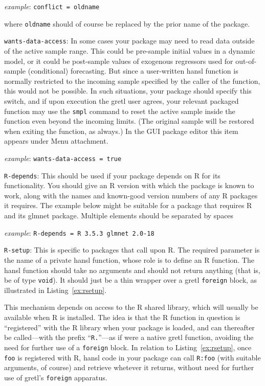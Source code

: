 \documentclass[oneside]{book}
\newcommand{\ttusage}[1]{\textit{example}: \quad \texttt{#1}}
\begin{document}
\begin{description}
  \ttusage{conflict = oldname}

  where \texttt{oldname} should of course be replaced by the prior name
  of the package.

\item \texttt{wants-data-access}: In some cases your package may need
  to read data outside of the active sample range. This could be
  pre-sample initial values in a dynamic model, or it could be
  post-sample values of exogenous regressors used for out-of-sample
  (conditional) forecasting.  But since a user-written hansl function
  is normally restricted to the incoming sample specified by the
  caller of the function, this would not be possible. In such
  situations, your package should specify this switch, and if upon
  execution the gretl user agrees, your relevant packaged function may
  use the \texttt{smpl} command to reset the active sample inside the
  function even beyond the incoming limits. (The original sample will
  be restored when exiting the function, as always.) In the GUI
  package editor this item appears under \textsf{Menu attachment}.

  \ttusage{wants-data-access = true}

\item \texttt{R-depends}: This should be used if your package depends
  on \textsf{R} for its functionality. You should give an \textsf{R}
  version with which the package is known to work, along with the
  names and known-good version numbers of any \textsf{R} packages it
  requires. The example below might be suitable for a package that
  requires \textsf{R} and its \textsf{glmnet} package. Multiple
  elements should be separated by spaces

  \ttusage{R-depends = R 3.5.3 glmnet 2.0-18}

\item \texttt{R-setup}: This is specific to packages that call upon
  \textsf{R}. The required parameter is the name of a private hansl
  function, whose role is to define an \textsf{R} function. The hansl
  function should take no arguments and should not return anything
  (that is, be of type \texttt{void}). It should just be a thin
  wrapper over a gretl \texttt{foreign} block, as illustrated in
  Listing~\ref{ex:rsetup}.

  This mechanism depends on access to the \textsf{R} shared library,
  which will usually be available when \textsf{R} is installed. The
  idea is that the \textsf{R} function in question is ``registered''
  with the \textsf{R} library when your package is loaded, and can
  thereafter be called---with the prefix ``\texttt{R.}''---as if were
  a native gretl function, avoiding the need for further use of a
  \texttt{foreign} block. In relation to Listing~\ref{ex:rsetup}, once
  \texttt{foo} is registered with \textsf{R}, hansl code in your
  package can call \texttt{R:foo} (with suitable arguments, of course)
  and retrieve whetever it returns, without need for further use of
  gretl's \texttt{foreign} apparatus.


\end{description}
\end{document}
